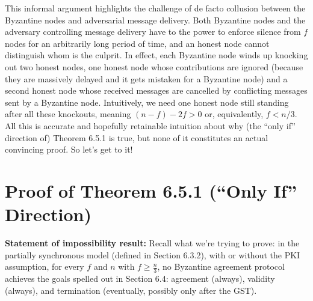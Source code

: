 This informal argument highlights the challenge of de facto collusion between the Byzantine
nodes and adversarial message delivery. Both Byzantine nodes and the adversary controlling
message delivery have to the power to enforce silence from $f$ nodes for an arbitrarily long
period of time, and an honest node cannot distinguish whom is the culprit. In effect, each
Byzantine node winds up knocking out two honest nodes, one honest node whose contributions are ignored (because they are massively delayed and it gets mistaken for a Byzantine node) and a second honest node whose received messages are cancelled by conflicting messages sent by a Byzantine node. Intuitively, we need one honest node still standing after all these knockouts, meaning $(n − f) − 2f > 0$ or, equivalently, $f < n/3$.
All this is accurate and hopefully retainable intuition about why (the “only if” direction
of) Theorem 6.5.1 is true, but none of it constitutes an actual convincing proof. So let’s get
to it!
\section{Proof of Theorem 6.5.1 (“Only If” Direction)}
\noindent
\textbf{Statement of impossibility result:} Recall what we’re trying to prove: in the partially
synchronous model (defined in Section 6.3.2), with or without the PKI assumption, for every
$f$ and $n$ with $f \geq \frac{n}{3}$, no Byzantine agreement protocol achieves the goals spelled out in
Section 6.4: agreement (always), validity (always), and termination (eventually, possibly only
after the GST).\\

